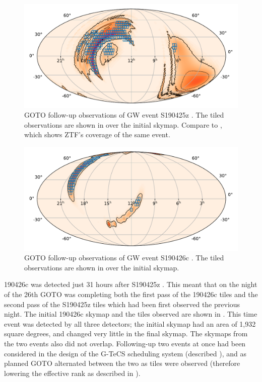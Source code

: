 \begin{colsection}
\begin{figure}[t]
    \begin{center}
        \includegraphics[width=0.9\linewidth]{images/190425_goto.pdf}
    \end{center}
    \caption[Follow-up observations of S190425z with GOTO]{
        GOTO follow-up observations of GW event S190425z \citep{S190425z_GOTO}. The tiled observations are shown in  over the initial skymap. Compare to , which shows ZTF's coverage of the same event.
        }\label{fig:190425_goto}
\end{figure}

\begin{figure}[t]
    \begin{center}
        \includegraphics[width=0.9\linewidth]{images/190426_goto.pdf}
    \end{center}
    \caption[Follow-up observations of S190426c with GOTO]{
        GOTO follow-up observations of GW event S190426c \citep{S190426c_GOTO}. The tiled observations are shown in  over the initial skymap.
        }\label{fig:190426_goto}
\end{figure}

190426c was detected just 31 hours after S190425z \citep{S190425z}. This meant that on the night of the 26th GOTO was completing both the first pass of the 190426c tiles and the second pass of the S190425z tiles which had been first observed the previous night. The initial 190426c skymap and the tiles observed are shown in . This time event was detected by all three detectors; the initial skymap had an area of 1,932 square degrees, and changed very little in the final skymap. The skymaps from the two events also did not overlap. Following-up two events at once had been considered in the design of the G-TeCS scheduling system (described ), and as planned GOTO alternated between the two as tiles were observed (therefore lowering the effective rank as described in ).


\end{colsection}
